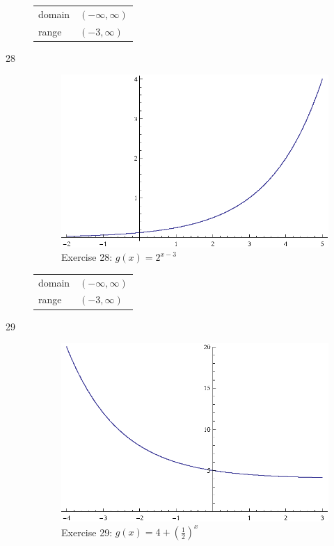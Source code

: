 \documentclass{exam}
\begin{document}
\begin{description}
      \begin{tabular}[H]{ll}
        \toprule
        domain & $(-\infty, \infty)$ \\
        range  & $(-3, \infty)$ \\
        \bottomrule
      \end{tabular}

    \item[28] 
      \begin{figure}[H]
        \centering
        \includegraphics[scale=1.0]{exercise28.eps}
        \caption*{Exercise 28: $g(x) = 2^{x - 3}$}
      \end{figure}

      \begin{tabular}[H]{ll}
        \toprule
        domain & $(-\infty, \infty)$ \\
        range  & $(-3, \infty)$ \\
        \bottomrule
      \end{tabular}

    \item[29] 
      \begin{figure}[H]
        \centering
        \includegraphics[scale=1.0]{exercise29.eps}
        \caption*{Exercise 29: $g(x) = 4 + \left( \frac{1}{2} \right)^x$}
      \end{figure}


\end{description}
\end{document}
